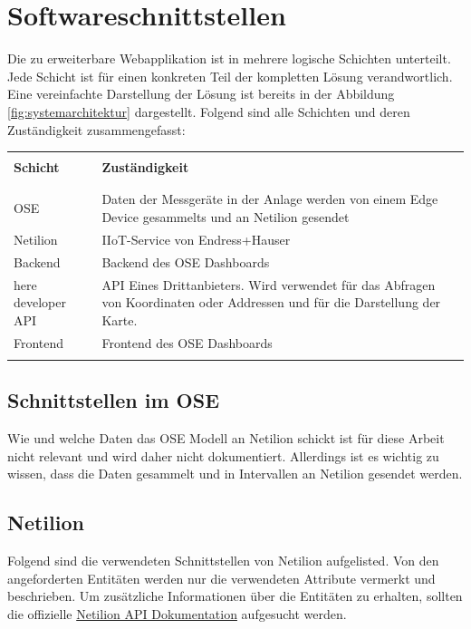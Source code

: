 \section{Softwareschnittstellen}
Die zu erweiterbare Webapplikation ist in mehrere logische Schichten unterteilt. Jede Schicht ist für einen konkreten Teil der kompletten Lösung verandwortlich. Eine vereinfachte Darstellung der Lösung ist bereits in der Abbildung \ref{fig:systemarchitektur} dargestellt. Folgend sind alle Schichten und deren Zuständigkeit zusammengefasst:
\begin{table}[H]
  \begin{tabularx}{\textwidth}{l X}\hline \\
  \textbf{Schicht} & \textbf{Zuständigkeit}  \\ \\\hline \\
  OSE & Daten der Messgeräte in der Anlage werden von einem Edge Device gesammelts und an Netilion gesendet \\
  Netilion & IIoT-Service von Endress+Hauser \\
  Backend & Backend des OSE Dashboards \\
  here developer API & API Eines Drittanbieters. Wird verwendet für das Abfragen von Koordinaten oder Addressen und für die Darstellung der Karte. \\
  Frontend & Frontend des OSE Dashboards \\
  \\\hline
  \end{tabularx}
\end{table}
\subsection{Schnittstellen im OSE}
Wie und welche Daten das OSE Modell an Netilion schickt ist für diese Arbeit nicht relevant und wird daher nicht dokumentiert. Allerdings ist es wichtig zu wissen, dass die Daten gesammelt und in Intervallen an Netilion gesendet werden.
\subsection{Netilion}
Folgend sind die verwendeten Schnittstellen von Netilion aufgelisted. Von den angeforderten Entitäten werden nur die verwendeten Attribute vermerkt und beschrieben. Um zusätzliche Informationen über die Entitäten zu erhalten, sollten die offizielle \href{https://api.iiot.endress.com/doc/v1/}{Netilion API Dokumentation} aufgesucht werden.

